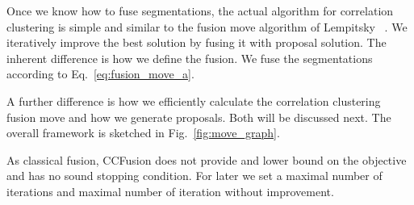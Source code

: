 \documentclass[10pt,twocolumn,letterpaper]{article}
\theoremstyle{definition}
\begin{document}
Once we know how to fuse segmentations, the actual algorithm 
for correlation clustering 
is simple and similar to the fusion move algorithm of Lempitsky \etal~\cite{Lempitsky-2010}.
We iteratively improve the best solution by
fusing it with proposal solution.
The inherent difference is how we define the fusion.
We fuse the segmentations according to Eq.~\ref{eq:fusion_move_a}.

A further difference is how we efficiently calculate the correlation clustering fusion move and how we generate proposals.
Both will be discussed next. The overall framework is sketched in Fig.~\ref{fig:move_graph}.

As classical fusion, CCFusion does not provide and lower bound on the objective and 
has no sound stopping condition.
For later we set a maximal number of iterations and maximal number of iteration without improvement.




%
%
%

%
\end{document}
